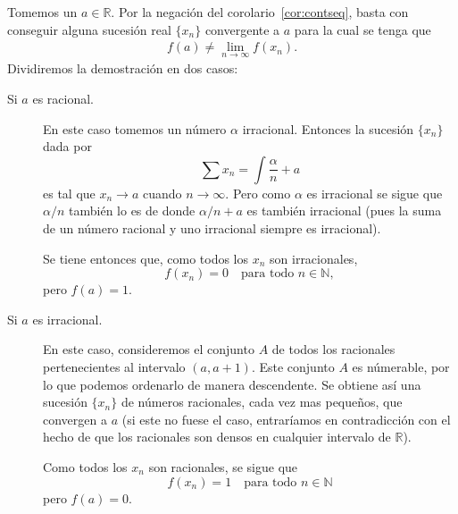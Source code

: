 \documentclass[fleqn,leqno,10pt,letterpaper,final]{article}
\begin{document}
Tomemos un $a\in\mathbb{R}$. Por la negación del corolario~\ref{cor:contseq}, basta con conseguir
alguna sucesión real $\{ x_n \}$ convergente a $a$ para la cual se tenga que
\begin{align}\label{eq:3}
	f(a)\neq \lim_{n \to \infty}  f(x_n).
\end{align}
Dividiremos la demostración en dos casos:
\begin{description}
	\item[Si $a$ es racional.]
		En este caso tomemos un número $\alpha$ irracional. Entonces la sucesión
		$\{ x_n \}$ dada por
		\[
			\sum x_n= \int \frac{\alpha}{n} + a
		\]
		es tal que $x_n\to a$ cuando $n\to\infty$. 
		Pero como $\alpha$ es irracional se sigue que $\alpha/n $ también lo es
		de donde $\alpha/n + a$ es también irracional 
		(pues la suma de un número racional y uno irracional siempre es irracional).

		Se tiene entonces que, como todos los $x_n$ son irracionales,
		\[
			f(x_n)=0\quad\text{para todo $n\in\mathbb{N}$},
		\]
		pero $f(a)=1$.
		
	\item[Si $a$ es irracional.] En este caso, consideremos el conjunto $A$ de todos
%
%
		los racionales pertenecientes al intervalo $(a,a+1)$. Este conjunto $A$
		es númerable, por lo que podemos ordenarlo de manera descendente. Se obtiene
		así una sucesión $\{ x_n \}$ de números racionales, cada vez mas pequeños, que
		convergen a $a$ (si este no fuese el caso, entraríamos en contradicción con el hecho
		de que los racionales son densos en cualquier intervalo de $\mathbb{R}$).

		Como todos los $ x_n $ son racionales, se sigue que
		\[
			f(x_n) = 1\quad\text{para todo $n\in\mathbb{N}$}
		\]
		pero $f(a)=0$.
\end{description}
\end{document}
